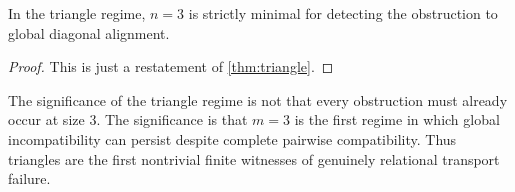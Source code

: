 \begin{corollary}
	In the triangle regime, \(n=3\) is strictly minimal for detecting the
	obstruction to global diagonal alignment.
\end{corollary}
\begin{proof}
	This is just a restatement of \cref{thm:triangle}.
\end{proof}
\begin{remark}
	The significance of the triangle regime is not that every obstruction
	must already occur at size \(3\). The significance is that \(m=3\) is
	the first regime in which global incompatibility can persist despite
	complete pairwise compatibility. Thus triangles are the first
	nontrivial finite witnesses of genuinely relational transport failure.
\end{remark}
